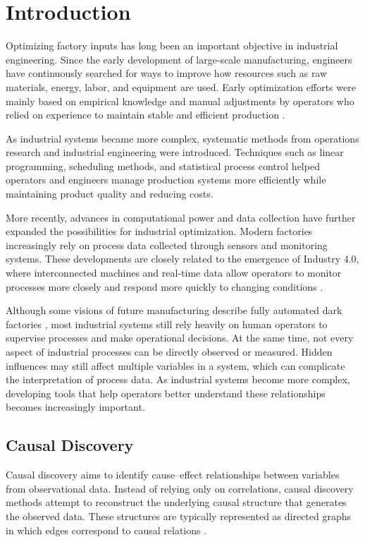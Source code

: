 \chapter{Introduction}
\label{cha:intro}

Optimizing factory inputs has long been an important objective in industrial engineering. Since the early development of large-scale manufacturing, engineers have continuously searched for ways to improve how resources such as raw materials, energy, labor, and equipment are used. Early optimization efforts were mainly based on empirical knowledge and manual adjustments by operators who relied on experience to maintain stable and efficient production \cite{stanley1992}.

As industrial systems became more complex, systematic methods from operations research and industrial engineering were introduced. Techniques such as linear programming, scheduling methods, and statistical process control helped operators and engineers manage production systems more efficiently while maintaining product quality and reducing costs.

More recently, advances in computational power and data collection have further expanded the possibilities for industrial optimization. Modern factories increasingly rely on process data collected through sensors and monitoring systems. These developments are closely related to the emergence of Industry 4.0, where interconnected machines and real-time data allow operators to monitor processes more closely and respond more quickly to changing conditions \cite{ind4}.

Although some visions of future manufacturing describe fully automated dark factories \cite{LightsOutManufacturing}, most industrial systems still rely heavily on human operators to supervise processes and make operational decisions. At the same time, not every aspect of industrial processes can be directly observed or measured. Hidden influences may still affect multiple variables in a system, which can complicate the interpretation of process data. As industrial systems become more complex, developing tools that help operators better understand these relationships becomes increasingly important.

\n

\section{Causal Discovery}

Causal discovery aims to identify cause--effect relationships between variables from observational data. Instead of relying only on correlations, causal discovery methods attempt to reconstruct the underlying causal structure that generates the observed data. These structures are typically represented as directed graphs in which edges correspond to causal relations \cite{Spirtes2000}.

